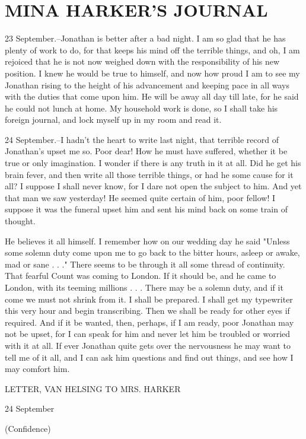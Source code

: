 \chapter{MINA HARKER'S JOURNAL}

23 September.--Jonathan is better after a bad night. I am so glad that he has plenty of work to do, for that keeps his mind off the terrible things, and oh, I am rejoiced that he is not now weighed down with the responsibility of his new position. I knew he would be true to himself, and now how proud I am to see my Jonathan rising to the height of his advancement and keeping pace in all ways with the duties that come upon him. He will be away all day till late, for he said he could not lunch at home. My household work is done, so I shall take his foreign journal, and lock myself up in my room and read it. 

24 September.--I hadn't the heart to write last night, that terrible record of Jonathan's upset me so. Poor dear! How he must have suffered, whether it be true or only imagination. I wonder if there is any truth in it at all. Did he get his brain fever, and then write all those terrible things, or had he some cause for it all? I suppose I shall never know, for I dare not open the subject to him. And yet that man we saw yesterday! He seemed quite certain of him, poor fellow! I suppose it was the funeral upset him and sent his mind back on some train of thought. 

He believes it all himself. I remember how on our wedding day he said "Unless some solemn duty come upon me to go back to the bitter hours, asleep or awake, mad or sane . . ." There seems to be through it all some thread of continuity. That fearful Count was coming to London. If it should be, and he came to London, with its teeming millions . . . There may be a solemn duty, and if it come we must not shrink from it. I shall be prepared. I shall get my typewriter this very hour and begin transcribing. Then we shall be ready for other eyes if required. And if it be wanted, then, perhaps, if I am ready, poor Jonathan may not be upset, for I can speak for him and never let him be troubled or worried with it at all. If ever Jonathan quite gets over the nervousness he may want to tell me of it all, and I can ask him questions and find out things, and see how I may comfort him. 

LETTER, VAN HELSING TO MRS. HARKER 

24 September 

(Confidence) 

